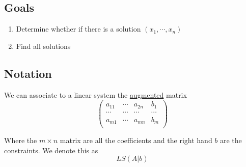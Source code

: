 \documentclass{article}
\newtheorem{one minute paper}[theorem]{One Minute Paper}
\begin{document}
\subsection*{Goals}
\begin{enumerate}
    \item Determine whether if there is a solution $(x_1, \cdots, x_n)$
    \item Find all solutions
\end{enumerate}

\subsection*{Notation}

We can associate to a linear system the \underline{augmented} matrix
\[
\begin{pmatrix}
    a_{11} & \cdots & a_{2n} & b_1\\
    \cdots & \cdots & \cdots & \cdots\\
    a_{m1} & \cdots & a_{mn} & b_m\\
\end{pmatrix}    
\]

Where the $m\times n$ matrix are all the coefficients and the right hand $b$ are the constraints. We denote this as 
\begin{equation}
    LS(A|b)
\end{equation}
\end{document}
